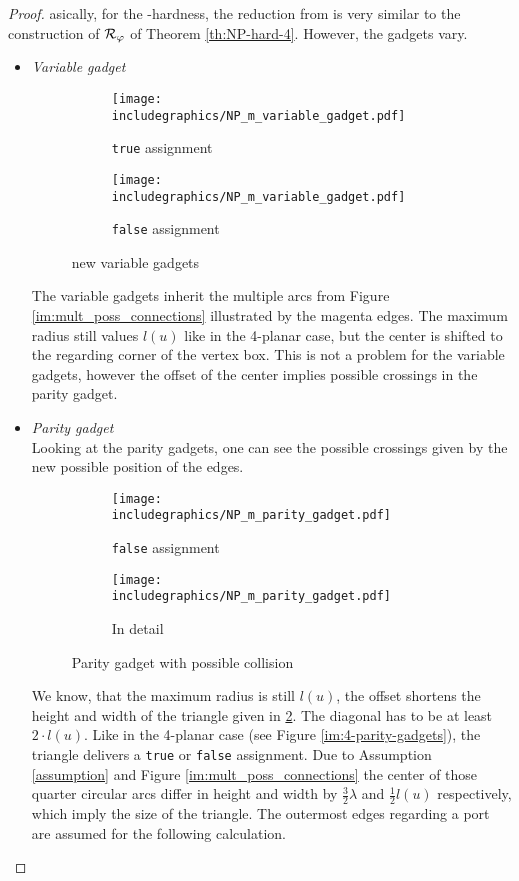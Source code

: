 \begin{proof}
asically, for the \NP-hardness, the reduction from  is very similar to the construction of $\mathcal{R}_\varphi$ of Theorem \ref{th:NP-hard-4}. However, the gadgets vary.
\begin{itemize}
	\item \textit{Variable gadget}\\
	\begin{figure}[h]
		\centering
		\begin{subfigure}{0.4\textwidth}
			\centering
			\texttt{[image: includegraphics/NP\_m\_variable\_gadget.pdf]}
			\caption{\texttt{true} assignment}
		\end{subfigure}
		\begin{subfigure}{0.4\textwidth}
			\centering
			\texttt{[image: includegraphics/NP\_m\_variable\_gadget.pdf]}
			\caption{\texttt{false} assignment}
		\end{subfigure}
		\caption{new variable gadgets}\label{im:m-variable-gadgets}
	\end{figure}
The variable gadgets inherit the multiple arcs from Figure \ref{im:mult_poss_connections} illustrated by the magenta edges. The maximum radius still values $l(u)$ like in the 4-planar case, but the center is shifted to the regarding corner of the vertex box. This is not a problem for the variable gadgets, however the offset of the center implies possible crossings in the parity gadget.
		\item \textit{Parity gadget}\\
		Looking at the parity gadgets, one can see the possible crossings given by the new possible position of the edges.
		\begin{figure}[H]
			\centering
			\begin{subfigure}{0.6\textwidth}
				\centering
				\texttt{[image: includegraphics/NP\_m\_parity\_gadget.pdf]}
				\caption{\texttt{false} assignment}
			\end{subfigure}
			\begin{subfigure}{0.6\textwidth}
				\centering
				\texttt{[image: includegraphics/NP\_m\_parity\_gadget.pdf]}
				\caption{In detail} \label{im:m-variable-gadgets-detail}
			\end{subfigure}
			\caption{Parity gadget with possible collision}\label{im:m-parity-gadgets}
		\end{figure}
		We know, that the maximum radius is still $l(u)$, the offset shortens the height and width of the triangle given in \ref{im:m-variable-gadgets-detail}. The diagonal has to be at least $2\cdot l(u)$. Like in the 4-planar case (see Figure \ref{im:4-parity-gadgets}), the triangle delivers a \texttt{true} or \texttt{false} assignment. Due to Assumption \ref{assumption} and Figure \ref{im:mult_poss_connections} the center of those quarter circular arcs differ in height and width by $\frac{3}{2}\lambda$ and $\frac{1}{2}l(u)$ respectively, which imply the size of the triangle. The outermost edges regarding a port are assumed for the following calculation.	

\end{itemize}
\end{proof}
